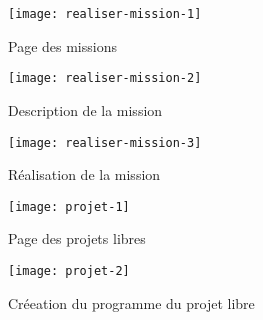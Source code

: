 \begin{figure}
  \begin{center}
    \texttt{[image: realiser-mission-1]}
    \caption{Page des missions}
    \label{fig:realiser-mission-1}
  \end{center}
\end{figure}
\begin{figure}
  \begin{center}
    \texttt{[image: realiser-mission-2]}
    \caption{Description de la mission}
    \label{fig:realiser-mission-2}
  \end{center}
\end{figure}
\begin{figure}
  \begin{center}
    \texttt{[image: realiser-mission-3]}
    \caption{Réalisation de la mission}
    \label{fig:realiser-mission-3}
  \end{center}
\end{figure}

\begin{figure}
  \begin{center}
    \texttt{[image: projet-1]}
    \caption{Page des projets libres}
    \label{fig:projet-1}
  \end{center}
\end{figure}
\begin{figure}
  \begin{center}
    \texttt{[image: projet-2]}
    \caption{Créeation du programme du projet libre}
    \label{fig:projet-2}
  \end{center}
\end{figure}

